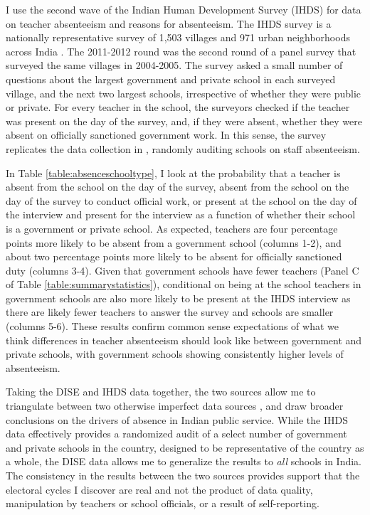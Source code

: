 \documentclass[hidelinks, 12pt, article, oneside]{memoir}
\begin{document}
I use the second wave of the Indian Human Development Survey (IHDS) for data on teacher absenteeism and reasons for absenteeism.  The IHDS survey is a nationally representative survey of 1,503 villages and 971 urban neighborhoods across India \citep{Desai2015}. The 2011-2012 round was the second round of a panel survey that surveyed the same villages in 2004-2005.  The survey asked a small number of questions about the largest government and private school in each surveyed village, and the next two largest schools, irrespective of whether they were public or private. For every teacher in the school, the surveyors checked if the teacher was present on the day of the survey, and, if they were absent, whether they were absent on officially sanctioned government work.  In this sense, the survey replicates the data collection in \cite{Chaudhury2006}, randomly auditing schools on staff absenteeism.

In Table \ref{table:absenceschooltype}, I look at the probability that a teacher is absent from the school on the day of the survey, absent from the school on the day of the survey to conduct official work, or present at the school on the day of the interview and present for the interview as a function of whether their school is a government or private school.  As expected, teachers are four percentage points more likely to be absent from a government school (columns 1-2), and about two percentage points more likely to be absent for officially sanctioned duty (columns 3-4).  Given that government schools have fewer teachers (Panel C of Table \ref{table:summarystatistics}), conditional on being at the school teachers in government schools are also more likely to be present at the IHDS interview as there are likely fewer teachers to answer the survey and schools are smaller (columns 5-6).  These results confirm common sense expectations of what we think differences in teacher absenteeism should look like between government and private schools, with government schools showing consistently higher levels of absenteeism.

\SingleSpacing



\DoubleSpacing

Taking the DISE and IHDS data together, the two sources allow me to triangulate between two otherwise imperfect data sources \citep{Herrera2007}, and draw broader conclusions on the drivers of absence in Indian public service.  While the IHDS data effectively provides a randomized audit of a select number of government and private schools in the country, designed to be representative of the country as a whole, the DISE data allows me to generalize the results to \emph{all} schools in India.  The consistency in the results between the two sources provides support that the electoral cycles I discover are real and not the product of data quality, manipulation by teachers or school officials, or a result of self-reporting.
\end{document}
